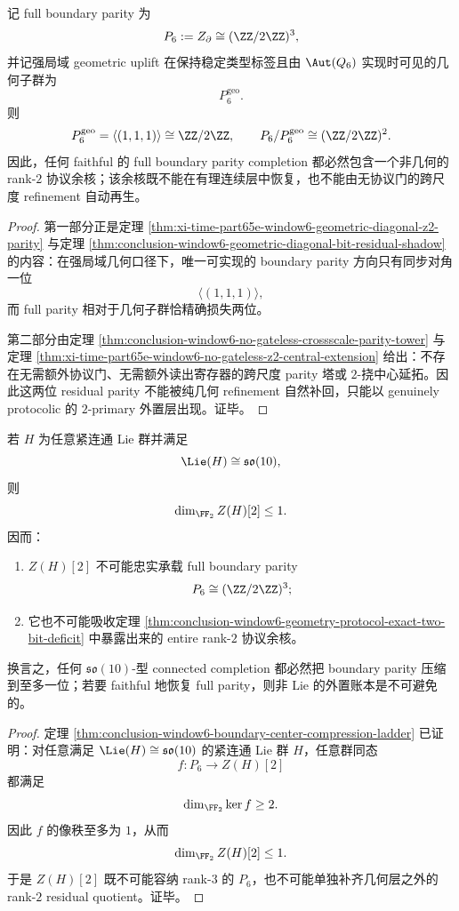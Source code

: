 \begin{theorem}[几何--协议分离与精确两比特亏损]\label{thm:conclusion-window6-geometry-protocol-exact-two-bit-deficit}
记 full boundary parity 为
\[
P_6:=Z_{\partial}\cong (\ZZ/2\ZZ)^3,
\]
并记强局域 geometric uplift 在保持稳定类型标签且由 \(\Aut(Q_6)\) 实现时可见的几何子群为
\[
P_6^{\mathrm{geo}}.
\]
则
\[
P_6^{\mathrm{geo}}=\langle(1,1,1)\rangle\cong \ZZ/2\ZZ,
\qquad
P_6/P_6^{\mathrm{geo}}\cong (\ZZ/2\ZZ)^2.
\]
因此，任何 faithful 的 full boundary parity completion 都必然包含一个非几何的 rank-\(2\) 协议余核；该余核既不能在有理连续层中恢复，也不能由无协议门的跨尺度 refinement 自动再生。
\end{theorem}
\begin{proof}
第一部分正是定理 \ref{thm:xi-time-part65e-window6-geometric-diagonal-z2-parity} 与定理 \ref{thm:conclusion-window6-geometric-diagonal-bit-residual-shadow} 的内容：在强局域几何口径下，唯一可实现的 boundary parity 方向只有同步对角一位
\[
\langle(1,1,1)\rangle,
\]
而 full parity 相对于几何子群恰精确损失两位。

第二部分由定理 \ref{thm:conclusion-window6-no-gateless-crossscale-parity-tower} 与定理 \ref{thm:xi-time-part65e-window6-no-gateless-z2-central-extension} 给出：不存在无需额外协议门、无需额外读出寄存器的跨尺度 parity 塔或 \(2\)-挠中心延拓。因此这两位 residual parity 不能被纯几何 refinement 自然补回，只能以 genuinely protocolic 的 \(2\)-primary 外置层出现。证毕。
\end{proof}

\begin{theorem}\label{thm:conclusion-window6-so10-center-deficit}
若 \(H\) 为任意紧连通 Lie 群并满足
\[
\Lie(H)\cong \mathfrak{so}(10),
\]
则
\[
\dim_{\FF_2}Z(H)[2]\le 1.
\]
因而：
\begin{enumerate}
  \item \(Z(H)[2]\) 不可能忠实承载 full boundary parity
  \[
  P_6\cong (\ZZ/2\ZZ)^3;
  \]
  \item 它也不可能吸收定理 \ref{thm:conclusion-window6-geometry-protocol-exact-two-bit-deficit} 中暴露出来的 entire rank-\(2\) 协议余核。
\end{enumerate}
换言之，任何 \(\mathfrak{so}(10)\)-型 connected completion 都必然把 boundary parity 压缩到至多一位；若要 faithful 地恢复 full parity，则非 Lie 的外置账本是不可避免的。
\end{theorem}
\begin{proof}
定理 \ref{thm:conclusion-window6-boundary-center-compression-ladder} 已证明：对任意满足 \(\Lie(H)\cong\mathfrak{so}(10)\) 的紧连通 Lie 群 \(H\)，任意群同态
\[
f:P_6\to Z(H)[2]
\]
都满足
\[
\dim_{\FF_2}\ker f\ge 2.
\]
因此 \(f\) 的像秩至多为 \(1\)，从而
\[
\dim_{\FF_2}Z(H)[2]\le 1.
\]
于是 \(Z(H)[2]\) 既不可能容纳 rank-\(3\) 的 \(P_6\)，也不可能单独补齐几何层之外的 rank-\(2\) residual quotient。证毕。
\end{proof}

